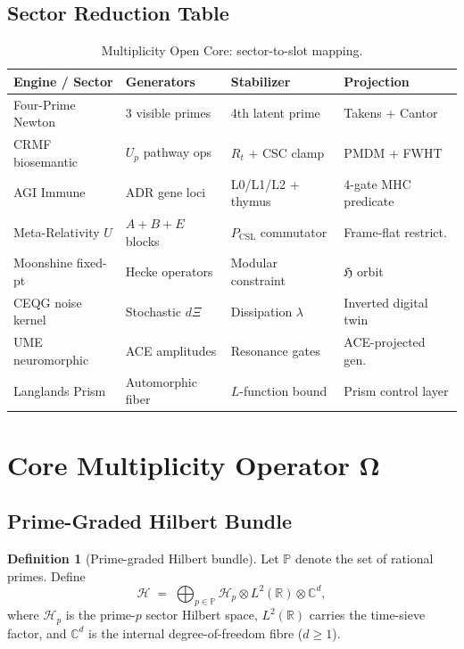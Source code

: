 \documentclass[12pt,a4paper]{article}
\theoremstyle{plain}
\theoremstyle{definition}
\newtheorem{definition}[theorem]{Definition}
\theoremstyle{remark}
\newcommand{\Hil}{\mathcal{H}}
\newcommand{\PP}{\mathbb{P}}
\newcommand{\Pcsl}{P_{\mathrm{CSL}}}
\begin{document}
\subsection{Sector Reduction Table}
\label{sec:table}

\begin{table}[h!]
\centering
\caption{Multiplicity Open Core: sector-to-slot mapping.}
\label{tab:moc}
\renewcommand{\arraystretch}{1.3}
\begin{tabular}{@{}llll@{}}
\toprule
\textbf{Engine / Sector} & \textbf{Generators} & \textbf{Stabilizer} & \textbf{Projection} \\
\midrule
Four-Prime Newton & 3 visible primes & 4th latent prime & Takens + Cantor \\
CRMF biosemantic & $U_p$ pathway ops & $R_t$ + CSC clamp & PMDM + FWHT \\
AGI Immune & ADR gene loci & L0/L1/L2 + thymus & 4-gate MHC predicate \\
\midrule
Meta-Relativity $U$ & $A+B+E$ blocks & $\Pcsl$ commutator & Frame-flat restrict. \\
Moonshine fixed-pt & Hecke operators & Modular constraint & $\mathfrak{H}$ orbit \\
CEQG noise kernel & Stochastic $d\Xi$ & Dissipation $\lambda$ & Inverted digital twin \\
UME neuromorphic & ACE amplitudes & Resonance gates & ACE-projected gen. \\
Langlands Prism & Automorphic fiber & $L$-function bound & Prism control layer \\
\bottomrule
\end{tabular}
\end{table}

\section{Core Multiplicity Operator $\boldsymbol{\Omega}$}
\label{sec:omega}

\subsection{Prime-Graded Hilbert Bundle}
\label{sec:bundle}

\begin{definition}[Prime-graded Hilbert bundle]
Let $\PP$ denote the set of rational primes. Define
\begin{equation}
  \Hil \;=\; \bigoplus_{p \in \PP} \Hil_p \otimes L^2(\mathbb{R})
            \otimes \mathbb{C}^d,
  \label{eq:bundle}
\end{equation}
where $\Hil_p$ is the prime-$p$ sector Hilbert space,
$L^2(\mathbb{R})$ carries the time-sieve factor, and $\mathbb{C}^d$
is the internal degree-of-freedom fibre ($d \ge 1$).
\end{definition}
\end{document}
